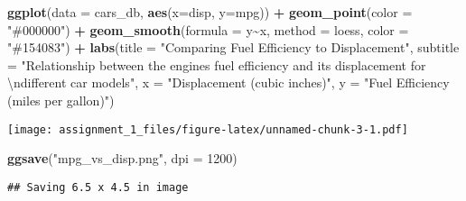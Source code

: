 \documentclass[
]{article}
\newenvironment{Shaded}{\begin{snugshade}}{\end{snugshade}}
\newcommand{\CharTok}[1]{\textcolor[rgb]{0.31,0.60,0.02}{#1}}
\newcommand{\DataTypeTok}[1]{\textcolor[rgb]{0.13,0.29,0.53}{#1}}
\newcommand{\DecValTok}[1]{\textcolor[rgb]{0.00,0.00,0.81}{#1}}
\newcommand{\KeywordTok}[1]{\textcolor[rgb]{0.13,0.29,0.53}{\textbf{#1}}}
\newcommand{\NormalTok}[1]{#1}
\newcommand{\OperatorTok}[1]{\textcolor[rgb]{0.81,0.36,0.00}{\textbf{#1}}}
\newcommand{\StringTok}[1]{\textcolor[rgb]{0.31,0.60,0.02}{#1}}
\begin{document}
\begin{Shaded}
\begin{Highlighting}[]
\KeywordTok{ggplot}\NormalTok{(}\DataTypeTok{data =}\NormalTok{ cars\_db, }\KeywordTok{aes}\NormalTok{(}\DataTypeTok{x=}\NormalTok{disp, }\DataTypeTok{y=}\NormalTok{mpg)) }\OperatorTok{+}\StringTok{ }\KeywordTok{geom\_point}\NormalTok{(}\DataTypeTok{color =} \StringTok{"\#000000"}\NormalTok{) }\OperatorTok{+}\StringTok{ }
\StringTok{  }\KeywordTok{geom\_smooth}\NormalTok{(}\DataTypeTok{formula =}\NormalTok{ y}\OperatorTok{\textasciitilde{}}\NormalTok{x, }\DataTypeTok{method =} \StringTok{\textquotesingle{}loess\textquotesingle{}}\NormalTok{, }\DataTypeTok{color =} \StringTok{"\#154083"}\NormalTok{) }\OperatorTok{+}
\StringTok{  }\KeywordTok{labs}\NormalTok{(}\DataTypeTok{title =} \StringTok{"Comparing Fuel Efficiency to Displacement"}\NormalTok{,}
       \DataTypeTok{subtitle =} \StringTok{"Relationship between the engine\textquotesingle{}s fuel efficiency and its displacement for }\CharTok{\textbackslash{}n}\StringTok{different car models"}\NormalTok{,}
       \DataTypeTok{x =} \StringTok{"Displacement (cubic inches)"}\NormalTok{,}
       \DataTypeTok{y =} \StringTok{"Fuel Efficiency (miles per gallon)"}\NormalTok{)}
\end{Highlighting}
\end{Shaded}

\texttt{[image: assignment\_1\_files/figure-latex/unnamed-chunk-3-1.pdf]}

\begin{Shaded}
\begin{Highlighting}[]
\KeywordTok{ggsave}\NormalTok{(}\StringTok{"mpg\_vs\_disp.png"}\NormalTok{, }\DataTypeTok{dpi =} \DecValTok{1200}\NormalTok{)}
\end{Highlighting}
\end{Shaded}

\begin{verbatim}
## Saving 6.5 x 4.5 in image
\end{verbatim}
\end{document}

